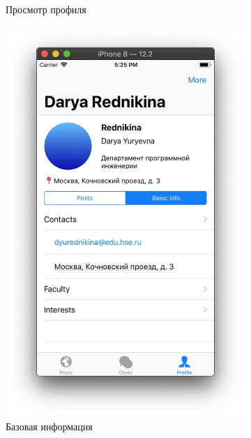 \documentclass[a4paper,12pt]{article}
\begin{document}
\begin{figure}[h!]
\begin{subfigure}[b]{0.3\linewidth}
			\caption{\label{pic: mypr} Просмотр профиля}
		\end{subfigure}
		\begin{subfigure}[b]{0.3\linewidth}
			\includegraphics[width=\linewidth]{../includes/pmi/basic_info.png}
			\caption{\label{pic: bi} Базовая информация}
		\end{subfigure}
		\begin{subfigure}[b]{0.3\linewidth}

\end{subfigure}
\end{figure}
\end{document}
